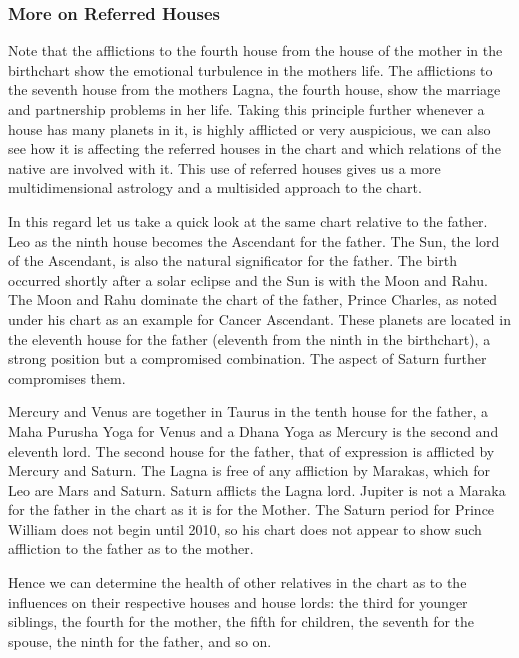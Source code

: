  

\subsubsection{More on Referred Houses}

 

Note that the afflictions to the fourth house from the house of the mother in the birthchart show the emotional turbulence in the mothers life. The afflictions to the seventh house from the mothers Lagna, the fourth house, show the marriage and partnership problems in her life. Taking this principle further whenever a house has many planets in it, is highly afflicted or very auspicious, we can also see how it is affecting the referred houses in the chart and which relations of the native are involved with it. This use of referred houses gives us a more multidimensional astrology and a multisided approach to the chart.

 

In this regard let us take a quick look at the same chart relative to the father. Leo as the ninth house becomes the Ascendant for the father. The Sun, the lord of the Ascendant, is also the natural significator for the father. The birth occurred shortly after a solar eclipse and the Sun is with the Moon and Rahu. The Moon and Rahu dominate the chart of the father, Prince Charles, as noted under his chart as an example for Cancer Ascendant. These planets are located in the eleventh house for the father (eleventh from the ninth in the birthchart), a strong position but a compromised combination. The aspect of Saturn further compromises them.

 

Mercury and Venus are together in Taurus in the tenth house for the father, a Maha Purusha Yoga for Venus and a Dhana Yoga as Mercury is the second and eleventh lord. The second house for the father, that of expression is afflicted by Mercury and Saturn. The Lagna is free of any affliction by Marakas, which for Leo are Mars and Saturn. Saturn afflicts the Lagna lord. Jupiter is not a Maraka for the father in the chart as it is for the Mother. The Saturn period for Prince William does not begin until 2010, so his chart does not appear to show such affliction to the father as to the mother.

 

Hence we can determine the health of other relatives in the chart as to the influences on their respective houses and house lords: the third for younger siblings, the fourth for the mother, the fifth for children, the seventh for the spouse, the ninth for the father, and so on.

